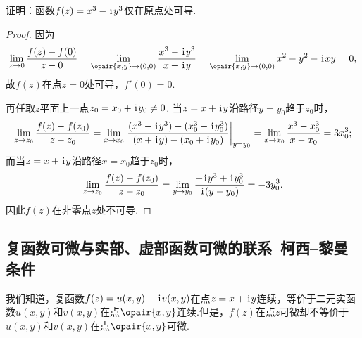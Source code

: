 \begin{example}
证明：函数\(f(z) = x^3 - \kern1pt\mathrm{i}\kern1pt y^3\)仅在原点处可导.
\begin{proof}
因为\[
\lim\limits_{z\to0} \frac{f(z) - f(0)}{z - 0}
= \lim\limits_{\opair{x,y}\to(0,0)} \frac{x^3 - \iu y^3}{x + \iu y}
= \lim\limits_{\opair{x,y}\to(0,0)} x^2 - y^2 - \iu xy
= 0,
\]故\(f(z)\)在点\(z = 0\)处可导，\(f'(0) = 0\).

再任取\(z\)平面上一点\(z_0 = x_0 + \kern1pt\mathrm{i}\kern1pt y_0 \neq 0\).
当\(z = x + \kern1pt\mathrm{i}\kern1pt y\)沿路径\(y = y_0\)趋于\(z_0\)时，\[
\lim\limits_{z \to z_0} \frac{f(z) - f(z_0)}{z - z_0}
= \lim\limits_{x \to x_0} \eval{\frac{(x^3 - \iu y^3) - (x_0^3 - \iu y_0^3)}{(x + \iu y) - (x_0 + \iu y_0)}}_{y = y_0}
= \lim\limits_{x \to x_0} \frac{x^3 - x_0^3}{x - x_0}
= 3 x_0^3;
\]而当\(z = x + \kern1pt\mathrm{i}\kern1pt y\)沿路径\(x = x_0\)趋于\(z_0\)时，\[
\lim\limits_{z \to z_0} \frac{f(z) - f(z_0)}{z - z_0}
= \lim\limits_{y \to y_0} \frac{-\kern1pt\mathrm{i}\kern1pt y^3 + \kern1pt\mathrm{i}\kern1pt y_0^3}{\kern1pt\mathrm{i}\kern1pt (y - y_0)}
= -3 y_0^3.
\]因此\(f(z)\)在非零点\(z\)处不可导.
\end{proof}
\end{example}

\subsection{复函数可微与实部、虚部函数可微的联系\ 柯西--黎曼条件}
我们知道，复函数\(f(z)=u(x,y)+\kern1pt\mathrm{i}\kern1pt v(x,y)\)在点\(z=x+\kern1pt\mathrm{i}\kern1pt y\)连续，等价于二元实函数\(u(x,y)\)和\(v(x,y)\)在点\(\opair{x,y}\)连续.但是，\(f(z)\)在点\(z\)可微却不等价于\(u(x,y)\)和\(v(x,y)\)在点\(\opair{x,y}\)可微.

